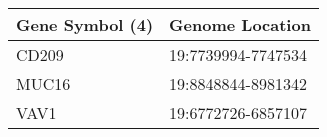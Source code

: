 \begin{tabular}{ll}
\toprule
Gene Symbol (4) &    Genome Location \\
\midrule
          CD209 & 19:7739994-7747534 \\
          MUC16 & 19:8848844-8981342 \\
           VAV1 & 19:6772726-6857107 \\
\bottomrule
\end{tabular}
